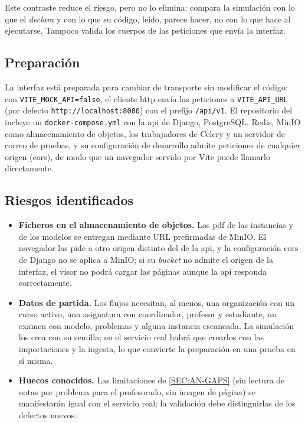 Este contraste reduce el riesgo, pero no lo elimina: compara la simulación con lo que el
 \emph{declara} y con lo que su código, leído, parece hacer, no con lo que hace
al ejecutarse. Tampoco valida los cuerpos de las peticiones que envía la interfaz.

\subsection{Preparación}

La interfaz está preparada para cambiar de transporte sin modificar el código: con
\texttt{VITE\_MOCK\_API=false}, el cliente \acs{http} envía las peticiones a
\texttt{VITE\_API\_URL} (por defecto \texttt{http://localhost:8000}) con el prefijo
\texttt{/api/v1}. El repositorio del  incluye un \texttt{docker-compose.yml} con
la \acs{api} de Django, PostgreSQL, Redis, MinIO como almacenamiento de objetos, los
trabajadores de Celery y un servidor de correo de pruebas, y su configuración de desarrollo
admite peticiones de cualquier origen (\acs{cors}), de modo que un navegador servido por Vite
puede llamarlo directamente.

\subsection{Riesgos identificados}

\begin{itemize}
  \item \textbf{Ficheros en el almacenamiento de objetos.} Los \acs{pdf} de las instancias y
        de los modelos se entregan mediante URL prefirmadas de MinIO. El navegador las pide
        a otro origen distinto del de la \acs{api}, y la configuración \acs{cors} de Django no
        se aplica a MinIO; si su \textit{bucket} no admite el origen de la interfaz, el visor
        no podrá cargar las páginas aunque la \acs{api} responda correctamente.
  \item \textbf{Datos de partida.} Los flujos necesitan, al menos, una organización con un
        curso activo, una asignatura con coordinador, profesor y estudiante, un examen con
        modelo, problemas y alguna instancia escaneada. La simulación los crea con su
        semilla; en el servicio real habrá que crearlos con las importaciones y la
        ingesta, lo que convierte la preparación en una prueba en sí misma.
  \item \textbf{Huecos conocidos.} Las limitaciones de \cref{SEC:AN-GAPS} (sin lectura de
        notas por problema para el profesorado, sin imagen de página) se manifestarán
        igual con el servicio real; la validación debe distinguirlas de los defectos
        nuevos.
\end{itemize}

